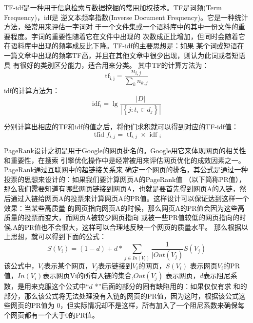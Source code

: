 TF-idf是一种用于信息检索与数据挖掘的常用加权技术。TF是词频(Term Frequency)，idf是
逆文本频率指数(Inverse Document Frequency)。它是一种统计方法，经常用来评估一字词对
于一个文件集或一个语料库中的其中一份文件的重要程度。字词的重要性随着它在文件中出现的
次数成正比增加，但同时会随着它在语料库中出现的频率成反比下降。TF-idf的主要思想是：如果
某个词或短语在一篇文章中出现的频率TF高，并且在其他文章中很少出现，则认为此词或者短语具
有很好的类别区分能力，适合用来分类。
其中TF的计算方法为：
\begin{equation}
    \mathrm{tf}_{\mathrm{i}, \mathrm{j}}=\frac{n_{i, j}}{\sum_{k} n_{k, j}}
\end{equation}
idf的计算方法为：
\begin{equation}
    \mathrm{idf}_{\mathrm{i}}=\lg \frac{|D|}{\left|\left\{j: t_{i} \in d_{j}\right\}\right|}
\end{equation}

分别计算出相应的TF和idf的值之后，将他们求积就可以得到对应的TF-idf值：
\begin{equation}
    \operatorname{tfid} f_{i, j}=\operatorname{tf}_{i, j} \times \text { idf }_{i}
\end{equation}

PageRank设计之初是用于Google的网页排名的。Google用它来体现网页的相关性和重要性，在搜索
引擎优化操作中是经常被用来评估网页优化的成效因素之一。PageRank通过互联网中的超链接关系来
确定一个网页的排名，其公式是通过一种投票的思想来设计的：如果我们要计算网页A的PageRank值
（以下简称PR值），那么我们需要知道有哪些网页链接到网页A，也就是要首先得到网页A的入链，然
后通过入链给网页A的投票来计算网页A的PR值。这样设计可以保证达到这样一个效果：当某些高质量
的网页指向网页A的时候，那么网页A的PR值会因为这些高质量的投票而变大，而网页A被较少网页指向
或被一些PR值较低的网页指向的时候,A的PR值也不会很大，这样可以合理地反映一个网页的质量水平。
那么根据以上思想，就可以得到下面的公式：
\begin{equation}
    S\left(V_{i}\right)=(1-d)+d * \sum_{j \in I n\left(V_{i}\right)} \frac{1}{\mid O u t\left(V_{j}\right)} S\left(V_{j}\right)
\end{equation}
该公式中，$V_{i}$表示某个网页，$V_{j}$表示链接到$V_{i}$的网页，$S\left(V_{i}\right)$
表示网页$V_{i}$的PR值，$I n\left(V_{i}\right)$表示网页Vi的所有入链的集合,$O u t\left(V_{j}\right)$
表示网页，$d$表示阻尼系数，是用来克服这个公式中“$d$ *”后面的部分的固有缺陷用的：如果仅仅有求
和的部分，那么该公式将无法处理没有入链的网页的PR值，因为这时，根据该公式这些网页的PR值为
0，但实际情况却不是这样，所有加入了一个阻尼系数来确保每个网页都有一个大于0的PR值。

